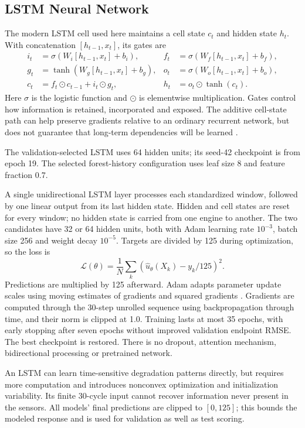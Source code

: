 \documentclass[11pt]{article}
\begin{document}
\subsection{LSTM Neural Network}
The modern LSTM cell used here maintains a cell state $c_t$ and hidden state $h_t$. With concatenation $[h_{t-1},x_t]$, its gates are
\begin{align}
 i_t&=\sigma(W_i[h_{t-1},x_t]+b_i), & f_t&=\sigma(W_f[h_{t-1},x_t]+b_f),\\
 g_t&=\tanh(W_g[h_{t-1},x_t]+b_g), & o_t&=\sigma(W_o[h_{t-1},x_t]+b_o),\\
 c_t&=f_t\odot c_{t-1}+i_t\odot g_t, & h_t&=o_t\odot\tanh(c_t).
\end{align}
Here $\sigma$ is the logistic function and $\odot$ is elementwise multiplication. Gates control how information is retained, incorporated and exposed. The additive cell-state path can help preserve gradients relative to an ordinary recurrent network, but does not guarantee that long-term dependencies will be learned \cite{lstm,pytorchlstm}.

The validation-selected LSTM uses 64 hidden units; its seed-42 checkpoint is from epoch 19. The selected forest-history configuration uses leaf size 8 and feature fraction 0.7.

A single unidirectional LSTM layer processes each standardized window, followed by one linear output from its last hidden state. Hidden and cell states are reset for every window; no hidden state is carried from one engine to another. The two candidates have 32 or 64 hidden units, both with Adam learning rate $10^{-3}$, batch size 256 and weight decay $10^{-5}$. Targets are divided by 125 during optimization, so the loss is
\begin{equation}
 \mathcal L(\theta)=\frac{1}{N}\sum_k\left(\hat u_\theta(X_k)-y_k/125\right)^2.
\end{equation}
Predictions are multiplied by 125 afterward. Adam adapts parameter update scales using moving estimates of gradients and squared gradients \cite{adam}. Gradients are computed through the 30-step unrolled sequence using backpropagation through time, and their norm is clipped at 1.0. Training lasts at most 35 epochs, with early stopping after seven epochs without improved validation endpoint RMSE. The best checkpoint is restored. There is no dropout, attention mechanism, bidirectional processing or pretrained network.

An LSTM can learn time-sensitive degradation patterns directly, but requires more computation and introduces nonconvex optimization and initialization variability. Its finite 30-cycle input cannot recover information never present in the sensors. All models' final predictions are clipped to $[0,125]$; this bounds the modeled response and is used for validation as well as test scoring.
\end{document}
